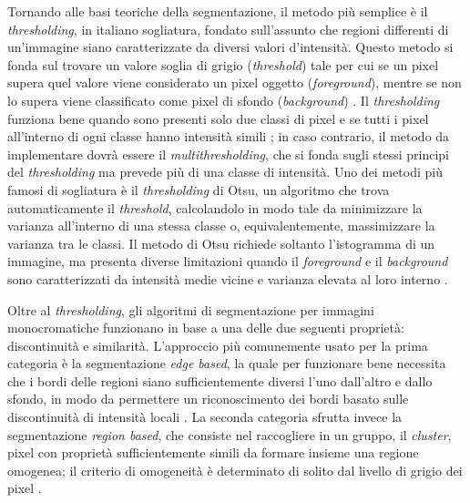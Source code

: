 Tornando alle basi teoriche della segmentazione, il metodo più semplice è il \textit{thresholding}, in italiano sogliatura, fondato sull'assunto che regioni differenti di un’immagine siano caratterizzate da diversi valori d’intensità. Questo metodo si fonda sul trovare un valore soglia di grigio (\textit{threshold}) tale per cui se un pixel supera quel valore viene considerato un pixel oggetto (\textit{foreground}), mentre se non lo supera viene classificato come pixel di sfondo (\textit{background}) \cite[743]{gonzalez}. Il \textit{thresholding} funziona bene quando sono presenti solo due classi di pixel e se tutti i pixel all’interno di ogni classe hanno intensità simili \cite[20]{LaRosa}; in caso contrario, il metodo da implementare dovrà essere il \textit{multithresholding}, che si fonda sugli stessi principi del \textit{thresholding} ma prevede più di una classe di intensità. Uno dei metodi più famosi di sogliatura è il \textit{thresholding} di Otsu, un algoritmo che trova automaticamente il \textit{threshold}, calcolandolo in modo tale da minimizzare la varianza all'interno di una stessa classe o, equivalentemente, massimizzare la varianza tra le classi. Il metodo di Otsu richiede soltanto l'istogramma di un immagine, ma presenta diverse limitazioni quando il \textit{foreground} e il \textit{background} sono caratterizzati da intensità medie vicine e varianza elevata al loro interno \cite[20]{LaRosa}.

Oltre al \textit{thresholding}, gli algoritmi di segmentazione per immagini monocromatiche funzionano in base a una delle due seguenti proprietà: discontinuità e similarità. L’approccio più comunemente usato per la prima categoria è la segmentazione \textit{edge based}, la quale per funzionare bene necessita che i bordi delle regioni siano sufficientemente diversi l’uno dall'altro e dallo sfondo, in modo da permettere un riconoscimento dei bordi basato sulle discontinuità di intensità locali \cite[700]{gonzalez}. La seconda categoria sfrutta invece la segmentazione \textit{region based}, che consiste nel raccogliere in un gruppo, il \textit{cluster}, pixel con proprietà sufficientemente simili da formare insieme una regione omogenea; il criterio di omogeneità è determinato di solito dal livello di grigio dei pixel \cite{Sharma2010}.

